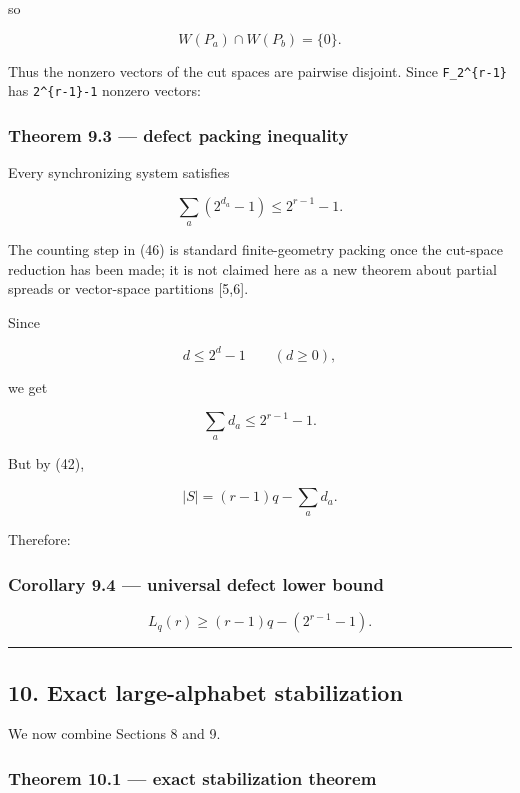 so

\[
W(P_a)\cap W(P_b)=\{0\}.
\tag{45}
\]

Thus the nonzero vectors of the cut spaces are pairwise disjoint. Since
\texttt{F\_2\^{}\{r-1\}} has \texttt{2\^{}\{r-1\}-1} nonzero vectors:

\hypertarget{theorem-9.3-defect-packing-inequality}{%
\subsubsection{Theorem 9.3 --- defect packing
inequality}\label{theorem-9.3-defect-packing-inequality}}

Every synchronizing system satisfies

\[
\boxed{
\sum_a(2^{d_a}-1)\le2^{r-1}-1.
}
\tag{46}
\]

The counting step in (46) is standard finite-geometry packing once the
cut-space reduction has been made; it is not claimed here as a new
theorem about partial spreads or vector-space partitions {[}5,6{]}.

Since

\[
d\le2^d-1
\qquad(d\ge0),
\tag{47}
\]

we get

\[
\sum_a d_a\le2^{r-1}-1.
\tag{48}
\]

But by (42),

\[
|S|=(r-1)q-\sum_a d_a.
\tag{49}
\]

Therefore:

\hypertarget{corollary-9.4-universal-defect-lower-bound}{%
\subsubsection{Corollary 9.4 --- universal defect lower
bound}\label{corollary-9.4-universal-defect-lower-bound}}

\[
\boxed{
L_q(r)\ge(r-1)q-(2^{r-1}-1).
}
\tag{50}
\]

\begin{center}\rule{0.5\linewidth}{0.5pt}\end{center}

\hypertarget{exact-large-alphabet-stabilization}{%
\subsection{10. Exact large-alphabet
stabilization}\label{exact-large-alphabet-stabilization}}

We now combine Sections 8 and 9.

\hypertarget{theorem-10.1-exact-stabilization-theorem}{%
\subsubsection{Theorem 10.1 --- exact stabilization
theorem}\label{theorem-10.1-exact-stabilization-theorem}}

